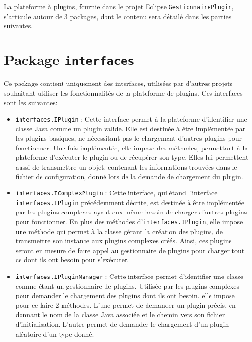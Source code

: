 
La plateforme à plugins, fournie dans le projet Eclipse \texttt{GestionnairePlugin}, s'articule autour de 3 packages, dont le contenu sera détailé dans les parties suivantes.


\section{Package \texttt{interfaces}}

Ce package contient uniquement des interfaces, utilisées par d'autres projets souhaitant utiliser les fonctionnalités de la plateforme de plugins. Ces interfaces sont les suivantes:\\

\begin{itemize}
	\item \texttt{interfaces.IPlugin} : Cette interface permet à la plateforme d'identifier une classe Java comme un plugin valide. Elle est destinée à être implémentée par les plugins basiques, ne nécessitant pas le chargement d'autres plugins pour fonctionner. Une fois implémentée, elle impose des méthodes, permettant à la plateforme d'exécuter le plugin ou de récupérer son type. Elles lui permettent aussi de transmettre un objet, contenant les informations trouvées dans le fichier de configuration, donné lors de la demande de chargement du plugin.
	\item \texttt{interfaces.IComplexPlugin} : Cette interface, qui étand l'interface \texttt{interfaces.IPlugin} précédemment décrite, est destinée à être implémentée par les plugins complexes ayant eux-même besoin de charger d'autres plugins pour fonctionner. En plus des méthodes d'\texttt{interfaces.IPlugin}, elle impose une méthode qui permet à la classe gérant la création des plugins, de transmettre son instance aux plugins complexes créés. Ainsi, ces plugins seront en mesure de faire appel au gestionnaire de plugins pour charger tout ce dont ils ont besoin pour s'exécuter.
	\item \texttt{interfaces.IPluginManager} :  Cette interface permet d'identifier une classe comme étant un gestionnaire de plugins. Utilisée par les plugins complexes pour demander le chargement des plugins dont ils ont besoin, elle impose pour ce faire 2 méthodes. L'une permet de demander un plugin précis, en donnant le nom de la classe Java associée et le chemin vers son fichier d'initialisation. L'autre permet de demander le chargement d'un plugin aléatoire d'un type donné.
\end{itemize}


